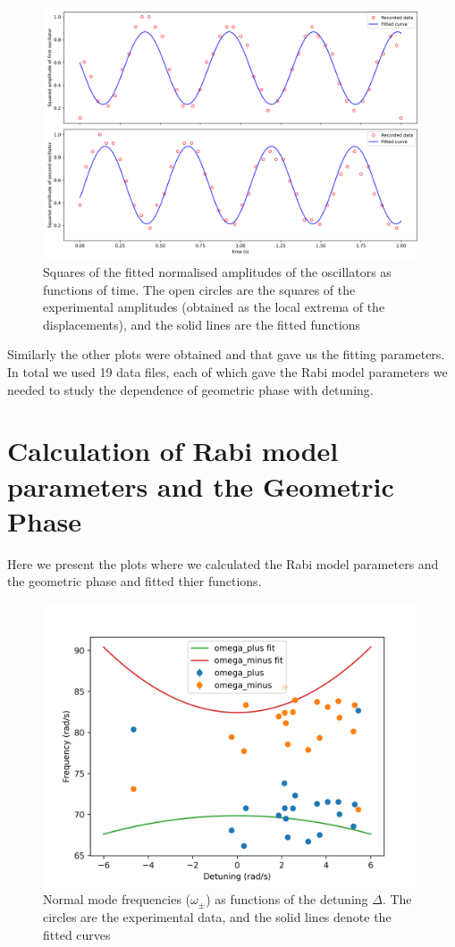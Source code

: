 \begin{figure}[H]
	\centering
	\includegraphics[scale=0.4]{01_squared.png}
	\caption{Squares of the fitted normalised amplitudes of the oscillators as functions of
		time. The open circles are the squares of the experimental amplitudes (obtained as the
		local extrema of the displacements), and the solid lines are the fitted functions}
	\label{fig:first_sq}
\end{figure}

Similarly the other plots were obtained and that gave us the fitting parameters. In total we used 19 data files, each of which gave the Rabi model parameters we needed to study the dependence of geometric phase with detuning. 

\section{Calculation of Rabi model parameters and the Geometric Phase}
Here we present the plots where we calculated the Rabi model parameters and the geometric phase and fitted thier functions.

\begin{figure}[H]
	\centering
	\includegraphics[scale=0.4]{20_freq_det.png}
	\caption{ Normal mode frequencies ($ \omega_{\pm} $) as functions of the detuning $ \Delta $. The circles are
		the experimental data, and the solid lines denote the fitted curves}
	\label{fig:first_sq}
\end{figure}


